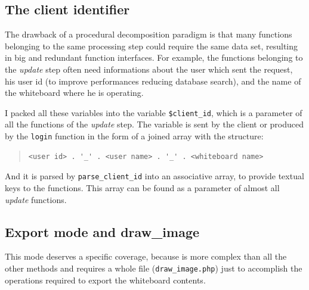 \documentclass[10pt,a4paper,english]{book}
\begin{document}

\hypertarget{the-client-identifier}{}
\subsection{The client identifier}
\label{the-client-identifier}

The drawback of a procedural decomposition paradigm is that many
functions belonging to the same processing step could require the same
data set, resulting in big and redundant function interfaces. For
example, the functions belonging to the \emph{update} step often need
informations about the user which sent the request, his user id (to
improve performances reducing database search), and the name of the
whiteboard where he is operating.

I packed all these variables into the variable \texttt{{\$}client{\_}id}, which
is a parameter of all the functions of the \emph{update} step. The variable
is sent by the client or produced by the \texttt{login} function in the
form of a joined array with the structure:
\begin{quote}\begin{verbatim}
<user id> . '_' . <user name> . '_' . <whiteboard name>
\end{verbatim}
\end{quote}

And it is parsed by \texttt{parse{\_}client{\_}id} into an associative array, to
provide textual keys to the functions. This array can be found as a
parameter of almost all \emph{update} functions.



\hypertarget{export-mode-and-draw-image}{}
\subsection{Export mode and draw{\_}image}
\label{export-mode-and-draw-image}

This mode deserves a specific coverage, because is more complex than
all the other methods and requires a whole file (\texttt{draw{\_}image.php})
just to accomplish the operations required to export the whiteboard
contents.
\end{document}
